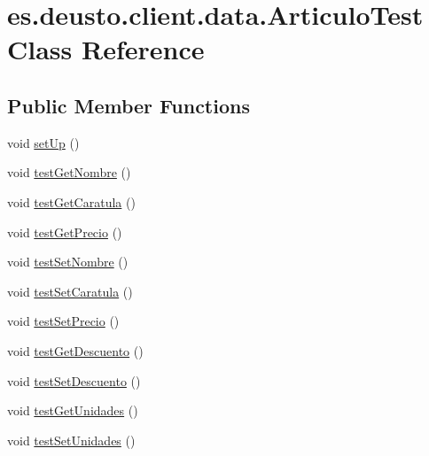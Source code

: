 \hypertarget{classes_1_1deusto_1_1client_1_1data_1_1_articulo_test}{}\section{es.\+deusto.\+client.\+data.\+Articulo\+Test Class Reference}
\label{classes_1_1deusto_1_1client_1_1data_1_1_articulo_test}
\subsection*{Public Member Functions}
\begin{DoxyCompactItemize}
\item 
void \mbox{\hyperlink{classes_1_1deusto_1_1client_1_1data_1_1_articulo_test_a309f19e5d42e0c94cbfe3262eeb348df}{set\+Up}} ()
\item 
void \mbox{\hyperlink{classes_1_1deusto_1_1client_1_1data_1_1_articulo_test_ac3e846820dec93a2e1eb9b71d8628c98}{test\+Get\+Nombre}} ()
\item 
void \mbox{\hyperlink{classes_1_1deusto_1_1client_1_1data_1_1_articulo_test_aca95e4fb7a2a3007e757775104cc96d8}{test\+Get\+Caratula}} ()
\item 
void \mbox{\hyperlink{classes_1_1deusto_1_1client_1_1data_1_1_articulo_test_a78f31112d6fbe746d831c3690607ad30}{test\+Get\+Precio}} ()
\item 
void \mbox{\hyperlink{classes_1_1deusto_1_1client_1_1data_1_1_articulo_test_a516510a4026082fdd4b4c20a87e1e1ef}{test\+Set\+Nombre}} ()
\item 
void \mbox{\hyperlink{classes_1_1deusto_1_1client_1_1data_1_1_articulo_test_a03ceab16d83d1fba35ff9987b8fffe80}{test\+Set\+Caratula}} ()
\item 
void \mbox{\hyperlink{classes_1_1deusto_1_1client_1_1data_1_1_articulo_test_ace1c88ea0ca5d2f9df55aa61a15fba37}{test\+Set\+Precio}} ()
\item 
void \mbox{\hyperlink{classes_1_1deusto_1_1client_1_1data_1_1_articulo_test_a79da69848a1bb85f816c1c53f029329f}{test\+Get\+Descuento}} ()
\item 
void \mbox{\hyperlink{classes_1_1deusto_1_1client_1_1data_1_1_articulo_test_ad1d6009a7e678861759127ec2f3e0977}{test\+Set\+Descuento}} ()
\item 
void \mbox{\hyperlink{classes_1_1deusto_1_1client_1_1data_1_1_articulo_test_aed674347eed51d3c784d9044c84876ed}{test\+Get\+Unidades}} ()
\item 
void \mbox{\hyperlink{classes_1_1deusto_1_1client_1_1data_1_1_articulo_test_a09931e201a7e383ba740f79b2180efe3}{test\+Set\+Unidades}} ()
\end{DoxyCompactItemize}


